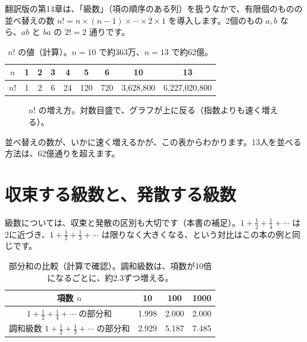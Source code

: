 \documentclass[a4paper,11pt,openany]{ltjsbook}
\begin{document}
翻訳版の第14章は、「級数」（項の順序のある列）を扱うなかで、有限個のものの並べ替えの数 $n!=n\times(n-1)\times\cdots\times2\times1$ を導入します。2個のもの $a,b$ なら、$ab$ と $ba$ の $2!=2$ 通りです。

\begin{table}[htbp]
\centering
\begin{tabular}{c|cccccccc}
\toprule
$n$ & 1 & 2 & 3 & 4 & 5 & 6 & 10 & 13\\
\midrule
$n!$ & 1 & 2 & 6 & 24 & 120 & 720 & 3{,}628{,}800 & 6{,}227{,}020{,}800\\
\bottomrule
\end{tabular}
\caption{$n!$ の値（計算）。$n=10$ で約363万、$n=13$ で約62億。}
\end{table}

\begin{figure}[htbp]
\centering
{}
\caption{$n!$ の増え方。対数目盛で、グラフが上に反る（指数よりも速く増える）。}
\end{figure}

並べ替えの数が、いかに速く増えるかが、この表からわかります。13人を並べる方法は、62億通りを超えます。

\section{収束する級数と、発散する級数}

級数については、収束と発散の区別も大切です（本書の補足）。$1+\tfrac12+\tfrac14+\cdots$ は2に近づき、$1+\tfrac12+\tfrac13+\cdots$ は限りなく大きくなる、という対比はこの本の例と同じです。

\begin{table}[htbp]
\centering
\begin{tabular}{c|ccc}
\toprule
項数 $n$ & 10 & 100 & 1000\\
\midrule
$1+\tfrac12+\tfrac14+\cdots$ の部分和 & 1.998 & 2.000 & 2.000\\
調和級数 $1+\tfrac12+\tfrac13+\cdots$ の部分和 & 2.929 & 5.187 & 7.485\\
\bottomrule
\end{tabular}
\caption{部分和の比較（計算で確認）。調和級数は、項数が10倍になるごとに、約2.3ずつ増える。}
\end{table}
\end{document}
